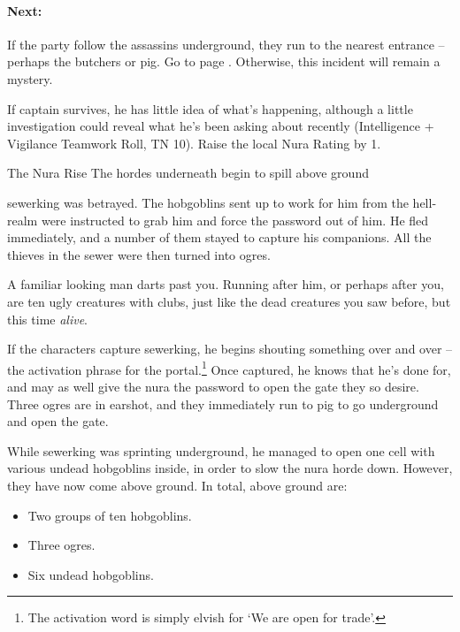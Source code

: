 \begin{multicols}{2}
\paragraph{Next:} If the party follow the assassins underground, they run to the nearest entrance -- perhaps the butchers or \gls{pig}.
Go to page \pageref{sewers}.  Otherwise, this incident will remain a mystery.

If \gls{captain} survives, he has little idea of what's happening, although a little investigation could reveal what he's been asking about recently (Intelligence + Vigilance Teamwork Roll, TN 10).
Raise the local Nura Rating by 1.

{\N \N The Nura Rise}%
{The hordes underneath begin to spill above ground}%

\Gls{sewerking} was betrayed.  The hobgoblins sent up to work for him from the hell-realm were instructed to grab him and force the password out of him.  He fled immediately, and a number of them stayed to capture his companions.  All the thieves in the sewer were then turned into ogres.

\begin{speechtext}

	A familiar looking man darts past you.
	Running after him, or perhaps after you, are ten ugly creatures with clubs, just like the dead creatures you saw before, but this time \emph{alive}.

\end{speechtext}


If the characters capture \gls{sewerking}, he begins shouting something over and over -- the activation phrase for the portal.\footnote{The activation word is simply elvish for `We are open for trade'.}
Once captured, he knows that he's done for, and may as well give the nura the password to open the gate they so desire.
Three ogres are in earshot, and they immediately run to \gls{pig} to go underground and open the gate.

While \gls{sewerking} was sprinting underground, he managed to open one cell with various undead hobgoblins inside, in order to slow the nura horde down.  However, they have now come above ground.  In total, above ground are:

\begin{itemize}

	\item{Two groups of ten hobgoblins.}
	\item{Three ogres.}
	\item{Six undead hobgoblins.}


\end{itemize}
\end{multicols}
